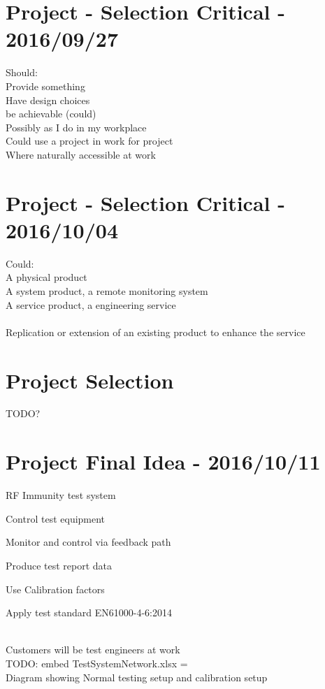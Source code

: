 \documentclass[a4paper]{article}
\begin{document}
\section{Project - Selection Critical - 2016/09/27}
Should:\\
Provide something\\
Have design choices\\
be achievable (could)\\
Possibly as I do in my workplace\\
Could use a project in work for project\\
 Where naturally accessible at work\\

\section{Project - Selection Critical - 2016/10/04}
Could:\\
A physical product\\
A system product, a remote monitoring system\\
A service product, a engineering service\\
\\
Replication or extension of an existing product to enhance the service\\

\section{Project Selection}
TODO?\\

\newpage

\section{Project Final Idea - 2016/10/11}
RF Immunity test system\\
\begin{itemize*}
  \item Control test equipment
  \item Monitor and control via feedback path
  \item Produce test report data
  \item Use Calibration factors
  \item Apply test standard EN61000-4-6:2014
\end{itemize*}\\
Customers will be test engineers at work\\
TODO: embed TestSystemNetwork.xlsx  = \\
Diagram showing Normal testing setup and calibration setup\\
\end{document}
